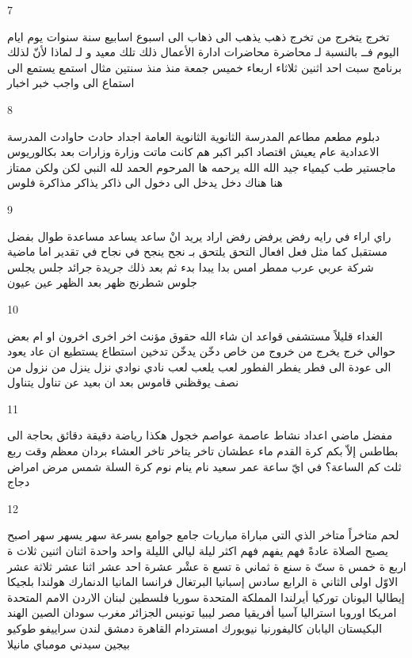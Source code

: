 \documentclass[twocolumn,a4paper]{article}
\begin{document}
7

\textarabic{ تخرج  يتخرج من  
 تخرج  
 ذهب  يذهب الى  
 ذهاب الى  
 اسبوع  اسابيع  
 سنة  سنوات  
 يوم  ايام  
 اليوم  
 فــ  
 بالنسبة لـ  
 محاضرة  محاضرات 
 ادارة اﻷعمال  
 ذلك  تلك  
 معيد  و  
 لـ  
 لماذا  
 ﻷنّ  
 لذلك  
 برنامج  
 سبت  
 احد  
 اثنين  
 ثلاثاء  
 اربعاء  
 خميس  
 جمعة  
 منذ  
 منذ سنتين  
 مثال  
 استمع  يستمع الى  
 استماع الى   
 واجب  
 خبر  اخبار  
}

8

\textarabic{ دبلوم  
 مطعم  مطاعم  
 المدرسة الثانوية  
 الثانوية العامة  
 اجداد  
 حادث  حاوادث  
 المدرسة الاعدادية  
 عام  
 يعيش  
 اقتصاد  
 اكبر  
 اكبر هم  
 كانت  
 ماتت  
 وزارة  وزارات 
 بعد  
 بكالوريوس  
 ماجستير  
 طب  
 كيمياء  
 جيد  
 الله  
 الله يرحمه  ها  
 المرحوم  
 الحمد لله  
 النبي  
 لكن  ولكن  
 ممتاز  
 هنا  
 هناك  
 دخل  يدخل الى  
 دخول الى  
 ذاكر  يذاكر  
 مذاكرة  
 فلوس  
}

9

\textarabic{ راي  اراء  
 في رايه  
 رفض  يرفض  
 رفض  
 اراد  يريد انْ  
 ساعد  يساعد  
 مساعدة  
 طوال  
 بفضل  
 مستقبل  
 كما  
 مثل  
 فعل  افعال  
 التحق  يلتحق بـ  
 نجح  ينجح في  
 نجاح في  
 تقدير  
 اما  
 ماضية  
 شركة  
 عربي  عرب  
 ممطر  
 امس  
 بدا  يبدا  
 بدء  
 ثم  
 بعد ذلك  
 جريدة  جرائد  
 جلس  يجلس  
 جلوس  
 شطرنج  
 ظهر  
 بعد الظهر  
 عين  عيون  
}

10

\textarabic{ الغداء  
 قليلاً  
 مستشفى  
 قواعد  
 ان شاء الله  
 حقوق  
 مؤنث  
 اخر  اخرى   
 اخرون  
 او  
 ام  
 بعض  
 حوالي  
 خرج  يخرج من  
 خروج من  
 خاص  
 دخّن  يدخّن  
 تدخين  
 استطاع  يستطيع ان  
 عاد  يعود الى  
 عودة الى  
 فطر  يفطر  
 الفطور  
 لعب  يلعب  
 لعب  
 نادي  نوادي  
 نزل  ينزل من  
 نزول من  
 نصف  
 يوقظني  
 قاموس  
 بعد ان  
 بعيد عن  
 تناول  يتناول  
}

11

\textarabic{ مفضل  
 ماضي  
 اعداد  
 نشاط   
 عاصمة  عواصم  
 خجول  
 هكذا  
 رياضة  
 دقيقة  دقائق  
 بحاجة الى  
 بطاطس  
 إلاّ  
 بكم  
 كرة القدم  
 ماء  
 عطشان  
 تاخر  يتاخر  
 تاخر  
 العشاء  
 بردان  
 معظم  
 وقت  
 ربع  
 ثلث  
 كم الساعة؟  
 في ايّ ساعة  
 عمر  
 سعيد  
 نام  ينام  
 نوم  
 كرة السلة  
 شمس  
 مرض  امراض  
 دجاج  
}

12

\textarabic{ لحم  
 متاخراً  
 متاخر  
 الذي  التي  
 مباراة  مباريات  
 جامع  جوامع  
 بسرعة  
 سهر  يسهر  
 سهر  
 اصبح  يصبح  
 الصلاة  
 عادةً  
 فهم  يفهم  
 فهم  
 اكثر  
 ليلة  ليالي  
 الليلة  
}\clearpage
\textarabic{
 واحد  واحدة  
 اثنان  اثنين  
 ثلاث  ة  
 اربع  ة  
 خمس  ة  
 ستّ  ة  
 سنع  ة  
 ثماني  ة  
 تسع  ة  
 عشْر  عشرة  
 احد عشر  
 اثنا عشر  
 ثلاثة عشر  
 الاوّل  اولى  
 الثاني  ة  
 الرابع  
 سادس  
}\clearpage
\textarabic{
 إسبانيا  
 البرتغال  
 فرانسا  
 المانيا  
  الدنمارك 
 هولندا  
 بلجيكا  
 إيطاليا  
 اليونان  
 توركيا  
 أيرلندا  
 المملكة المتحدة 
 سوريا  
 فلسطين  
 لبنان  
 الاردن  
 اﻻمم المتحدة  
 امريكا  
 اوروبا  
 استراليا  
 آسيا  
 أفريقيا  
 مصر  
 ليبيا  
 تونيس  
 الجزائر  
 مغرب  
 سودان  
 الصين  
 الهند  
 البكيستان  
 اليابان  
 كاليفورنيا  
 نيويورك  
 امستردام  
 القاهرة  
 دمشق  
 لندن  
 سراييفو  
 طوكيو  
 بيجين  
 سيدني  
 مومباي  
 مانيلا  
}
\end{document}
